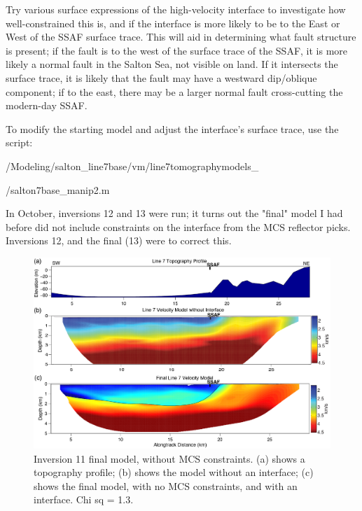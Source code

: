 \documentclass[fontsize=11pt, %
                             paper=a4, %
                             twoside, %
                             captions=tableheading,
                             index=totoc,
                             hyperref]{labbook}
\begin{document}
\begin{addmargin}[4cm]{0cm} %

\pagestyle{scrheadings} %







Try various surface expressions of the high-velocity interface to investigate how well-constrained this is, and if the interface is more likely to be to the East or West of the SSAF surface trace.  This will aid in determining what fault structure is present; if the fault is to the west of the surface trace of the SSAF, it is more likely a normal fault in the Salton Sea, not visible on land.  If it intersects the surface trace, it is likely that the fault may have a westward dip/oblique component; if to the east, there may be a larger normal fault cross-cutting the modern-day SSAF.

To modify the starting model and adjust the interface's surface trace, use the script:

/Modeling/salton\_line7base/vm/line7tomographymodels\_

/salton7base\_manip2.m


In October, inversions 12 and 13 were run; it turns out the "final" model I had before did not include constraints on the interface from the MCS reflector picks.  Inversions 12, and the final (13) were to correct this.  

\begin{figure}[h!]
\raggedleft
\includegraphics[scale=0.5,keepaspectratio=true]{figs/Salton7base_final11_topo_edit2.png}
\caption{Inversion 11 final model, without MCS constraints. (a) shows a topography profile; (b) shows the model without an interface; (c) shows the final model, with no MCS constraints, and with an interface.   Chi sq = 1.3.  }
\label{fig:line7noMCS}
\end{figure}


\end{addmargin}
\end{document}
